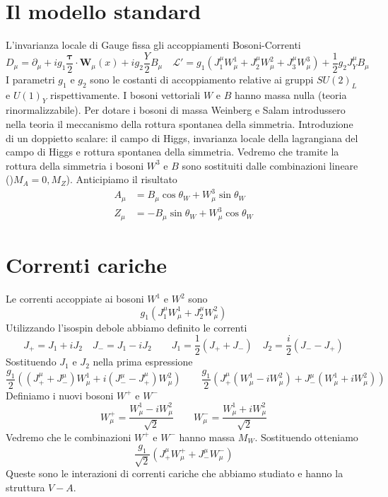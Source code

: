 \section{Il modello standard}
L'invarianza locale di Gauge fissa gli accoppiamenti Bosoni-Correnti
$$D_\mu = \partial_\mu + ig_1 \frac{\boldsymbol{\tau}}{2} \cdot \mathbf{W}_\mu(x) + ig_2 \frac{Y}{2} B_\mu \quad \mathcal{L}' = g_1 \left( J_1^\mu W_\mu^1 + J_2^\mu W_\mu^2 + J_3^\mu W_\mu^3 \right) + \frac{1}{2} g_2 J_Y^\mu B_\mu$$
I parametri $g_1$ e $g_2$ sono le costanti di accoppiamento relative ai gruppi $SU(2)_L$ e $U(1)_Y$ rispettivamente. I bosoni vettoriali $W$ e $B$ hanno massa nulla (teoria rinormalizzabile). Per dotare i bosoni di massa Weinberg e Salam introdussero nella teoria il meccanismo della rottura spontanea della simmetria. Introduzione di un doppietto scalare: il campo di Higgs, invarianza locale della lagrangiana del campo di Higgs e rottura spontanea della simmetria. Vedremo che tramite la rottura della simmetria i bosoni $W^3$ e $B$ sono sostituiti dalle combinazioni lineare ()$M_A=0, M_Z$). Anticipiamo il risultato
$$\begin{aligned}
	A_\mu &= B_\mu \cos\theta_W + W_\mu^3 \sin\theta_W \\
	Z_\mu &= -B_\mu \sin\theta_W + W_\mu^3 \cos\theta_W
\end{aligned}$$
\section{Correnti cariche}
Le correnti accoppiate ai bosoni $W^1$ e $W^2$ sono
$$g_1(J_1^\mu W_\mu^1 + J_2^\mu W_\mu^2)$$
Utilizzando l'isospin debole abbiamo definito le correnti
$$J_+ = J_1 + iJ_2 \quad J_- = J_1 - iJ_2 \qquad J_1 = \frac{1}{2}(J_+ + J_-) \quad J_2 = \frac{i}{2}(J_- - J_+)$$
Sostituendo $J_1$ e $J_2$ nella prima espressione
$$\frac{g_1}{2} \left( (J_+^\mu + J_-^\mu)W_\mu^1 + i(J_-^\mu - J_+^\mu)W_\mu^2 \right) \qquad \frac{g_1}{2} \left( J_+^\mu(W_\mu^1 - iW_\mu^2) + J_-^\mu(W_\mu^1 + iW_\mu^2) \right)$$
Definiamo i nuovi bosoni $W^+$ e $W^-$
$$W_\mu^+ = \frac{W_\mu^1 - iW_\mu^2}{\sqrt{2}} \qquad W_\mu^- = \frac{W_\mu^1 + iW_\mu^2}{\sqrt{2}}$$
Vedremo che le combinazioni $W^+$ e $W^-$ hanno massa $M_W$. Sostituendo otteniamo
$$\frac{g_1}{\sqrt{2}} \left( J_+^\mu W_\mu^+ + J_-^\mu W_\mu^- \right)$$
Queste sono le interazioni di correnti cariche che abbiamo studiato e hanno la struttura $V-A$.

